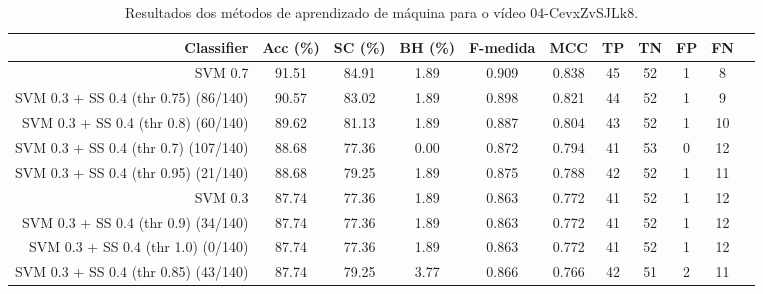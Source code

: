 \begin{table}[!htb]
\centering
\caption{Resultados dos métodos de aprendizado de máquina para o vídeo 04-CevxZvSJLk8.}
\label{tab:04-CevxZvSJLk8}
\begin{tabular}{r|c|c|c|c|c|c|c|c|c|c}
\hline\hline
Classifier & Acc (\%) & SC (\%) & BH (\%) & F-medida & MCC & TP & TN & FP & FN \\ \hline
SVM 0.7 & 91.51 & 84.91 & 1.89 & 0.909 & 0.838 & 45 & 52 & 1 & 8 \\ 
SVM 0.3 + SS 0.4 (thr 0.75) (86/140) & 90.57 & 83.02 & 1.89 & 0.898 & 0.821 & 44 & 52 & 1 & 9 \\ 
SVM 0.3 + SS 0.4 (thr 0.8) (60/140) & 89.62 & 81.13 & 1.89 & 0.887 & 0.804 & 43 & 52 & 1 & 10 \\ 
SVM 0.3 + SS 0.4 (thr 0.7) (107/140) & 88.68 & 77.36 & 0.00 & 0.872 & 0.794 & 41 & 53 & 0 & 12 \\ 
SVM 0.3 + SS 0.4 (thr 0.95) (21/140) & 88.68 & 79.25 & 1.89 & 0.875 & 0.788 & 42 & 52 & 1 & 11 \\ 
SVM 0.3 & 87.74 & 77.36 & 1.89 & 0.863 & 0.772 & 41 & 52 & 1 & 12 \\ 
SVM 0.3 + SS 0.4 (thr 0.9) (34/140) & 87.74 & 77.36 & 1.89 & 0.863 & 0.772 & 41 & 52 & 1 & 12 \\ 
SVM 0.3 + SS 0.4 (thr 1.0) (0/140) & 87.74 & 77.36 & 1.89 & 0.863 & 0.772 & 41 & 52 & 1 & 12 \\ 
SVM 0.3 + SS 0.4 (thr 0.85) (43/140) & 87.74 & 79.25 & 3.77 & 0.866 & 0.766 & 42 & 51 & 2 & 11 \\ 
\hline\hline
\end{tabular}
\end{table}
